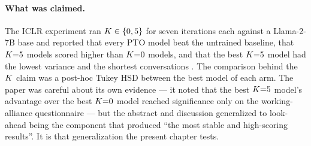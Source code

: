 \paragraph{What was claimed.}
The ICLR experiment ran $K \in \{0,5\}$ for seven iterations each against a Llama-2-7B base and
reported that every PTO model beat the untrained baseline, that $K{=}5$ models scored higher
than $K{=}0$ models, and that the best $K{=}5$ model had the lowest variance and the shortest
conversations \citep{baruch2025pto}. The comparison behind the $K$ claim was a post-hoc Tukey
HSD between the best model of each arm. The paper was careful about its own evidence --- it
noted that the best $K{=}5$ model's advantage over the best $K{=}0$ model reached significance
only on the working-alliance questionnaire --- but the abstract and discussion generalized to
look-ahead being the component that produced ``the most stable and high-scoring results''. It is
that generalization the present chapter tests.
